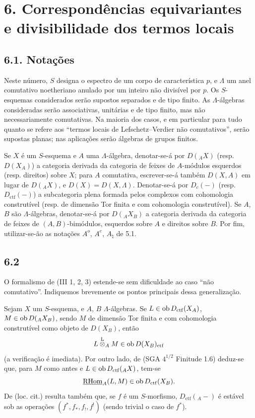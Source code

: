 \section*{6. Correspondências equivariantes e divisibilidade dos termos locais}

\subsection*{6.1. Notações}

Neste número, $S$ designa o espectro de um corpo de característica $p$, e $\Lambda$ um anel comutativo noetheriano anulado por um inteiro não divisível por $p$. Os $S$-esquemas considerados serão supostos separados e de tipo finito. As $\Lambda$-álgebras consideradas serão associativas, unitárias e de tipo finito, mas não necessariamente comutativas. Na maioria dos casos, e em particular para tudo quanto se refere aos ``termos locais de Lefschetz--Verdier não comutativos'', serão supostas planas; nas aplicações serão álgebras de grupos finitos.

Se $X$ é um $S$-esquema e $A$ uma $\Lambda$-álgebra, denotar-se-á por $D({}_AX)$ (resp. $D(X_A)$) a categoria derivada da categoria de feixes de $A$-módulos esquerdos (resp. direitos) sobre $X$; para $A$ comutativa, escrever-se-á também $D(X,A)$ em lugar de $D({}_AX)$, e $D(X)=D(X,\Lambda)$. Denotar-se-á por $D_c(-)$ (resp. $D_{\mathrm{ctf}}(-)$) a subcategoria plena formada pelos complexos com cohomologia construtível (resp. de dimensão Tor finita e com cohomologia construtível). Se $A$, $B$ são $\Lambda$-álgebras, denotar-se-á por $D({}_AX_B)$ a categoria derivada da categoria de feixes de $(A,B)$-bimódulos, esquerdos sobre $A$ e direitos sobre $B$. Por fim, utilizar-se-ão as notações $A^o$, $A^e$, $A_{\natural}$ de 5.1.

\subsection*{6.2}
O formalismo de (III 1, 2, 3) estende-se sem dificuldade ao caso ``não comutativo''. Indiquemos brevemente os pontos principais dessa generalização.

Sejam $X$ um $S$-esquema, e $A$, $B$ $\Lambda$-álgebras. Se $L\in\operatorname{ob} D_{\mathrm{ctf}}(X_A)$, $M\in\operatorname{ob} D({}_AX_B)$, sendo $M$ de dimensão Tor finita e com cohomologia construtível como objeto de $D(X_B)$, então
\[
L\overset{\mathrm L}{\otimes}_A M\in\operatorname{ob} D(X_B)_{\mathrm{ctf}}
\]
(a verificação é imediata). Por outro lado, de (SGA $4^{1/2}$ Finitude 1.6) deduz-se que, para $M$ como antes e $L\in\operatorname{ob} D_{\mathrm{ctf}}({}_AX)$, tem-se
\[
\underline{\mathrm{RHom}}_A(L,M)\in\operatorname{ob} D_{\mathrm{ctf}}(X_B).
\]
De (loc. cit.) resulta também que, se $f$ é um $S$-morfismo, $D_{\mathrm{ctf}}({}_A-)$ é estável sob as operações $(f^*,f_*,f_!,f^!)$ (sendo trivial o caso de $f^*$).
